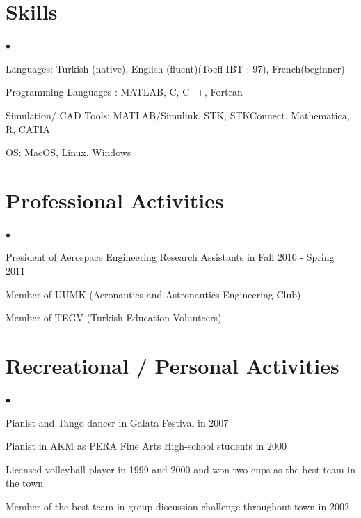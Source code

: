 \documentclass[margin,line]{res}
\newenvironment{list2}{
  \begin{list}{$\bullet$}{
      \setlength{\itemsep}{0in}
      \setlength{\parsep}{0in} \setlength{\parskip}{0in}
      \setlength{\topsep}{0in} \setlength{\partopsep}{0in}
      \setlength{\leftmargin}{0.2in}}}{\end{list}}
\begin{document}
\begin{resume}
\section{\sc Skills}
\begin{list2}
\item Languages: Turkish (native), English (fluent)(Toefl IBT : 97), French(beginner)
\item Programming Languages : MATLAB, C, C++, Fortran
\item Simulation/ CAD Tools: MATLAB/Simulink, STK, STKConnect, Mathematica, R, CATIA
\item OS: MacOS, Linux, Windows
\end{list2}


\section{\sc Professional Activities}
\begin{list2}
\item	President of Aerospace Engineering Research Assistants in  Fall 2010 - Spring 2011
\item	Member of UUMK (Aeronautics and Astronautics Engineering Club)
\item	Member of TEGV (Turkish Education Volunteers)
\end{list2}


\section{\sc Recreational / Personal Activities}
\begin{list2}
\item	Pianist and Tango dancer in Galata Festival in 2007
\item	Pianist in AKM as PERA Fine Arts High-school students in 2000
\item	Licensed volleyball player in 1999 and 2000 and won two cups as the best team in the town
\item	Member of the best team in group discussion challenge throughout town in 2002
\end{list2}



\end{resume}
\end{document}
